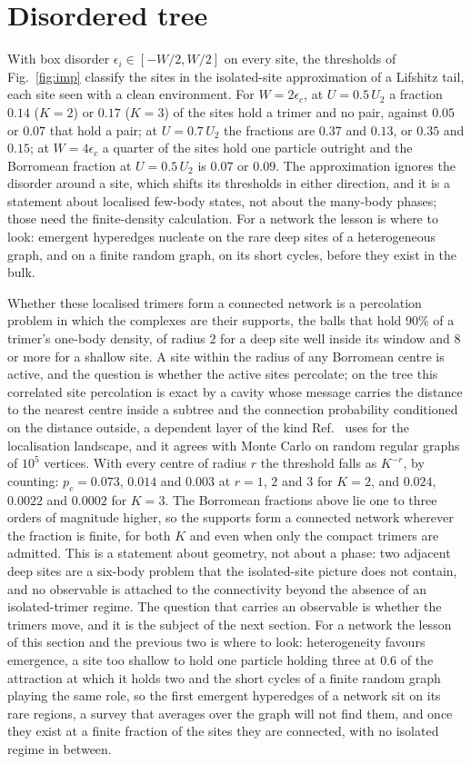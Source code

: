 \documentclass[aps,pre,twocolumn,superscriptaddress,floatfix]{revtex4-2}
\newcommand{\Up}{U_{2}}
\newcommand{\eps}{\epsilon}
\begin{document}
\section{Disordered tree}
\label{sec:disorder}
With box disorder $\eps_{i}\in[-W/2,W/2]$ on
every site, the thresholds of Fig.~\ref{fig:imp} classify the sites in
the isolated-site approximation of a Lifshitz tail, each site seen with a
clean environment. For $W=2\eps_{c}$, at $U=0.5\,\Up$ a fraction $0.14$
($K=2$) or $0.17$ ($K=3$) of the sites hold a trimer and no pair, against
$0.05$ or $0.07$ that hold a pair; at $U=0.7\,\Up$ the fractions are
$0.37$ and $0.13$, or $0.35$ and $0.15$; at $W=4\eps_{c}$ a quarter of the
sites hold one particle outright and the Borromean fraction at
$U=0.5\,\Up$ is $0.07$ or $0.09$. The approximation ignores the disorder
around a site, which shifts its thresholds in either direction, and it is
a statement about localised few-body states, not about the many-body
phases; those need the finite-density calculation. For a network the
lesson is where to look: emergent hyperedges nucleate on the rare deep
sites of a heterogeneous graph, and on a finite random graph, on its
short cycles, before they exist in the bulk.

Whether these localised trimers form a connected network is a
percolation problem in which the complexes are their supports, the balls
that hold $90\%$ of a trimer's one-body density, of radius $2$ for a deep
site well inside its window and $8$ or more for a shallow site. A site
within the radius of any Borromean centre is active, and the question is
whether the active sites percolate; on the tree this correlated site percolation is exact by a cavity
whose message carries the distance to the nearest centre inside a
subtree and the connection probability conditioned on the distance
outside, a dependent layer of the kind Ref.~\cite{chybook} uses for the
localisation landscape, and it agrees with Monte Carlo on random regular
graphs of $10^{5}$ vertices. With every centre of radius
$r$ the threshold falls as $K^{-r}$, by counting: $p_{c}=0.073$, $0.014$
and $0.003$ at $r=1$, $2$ and $3$ for $K=2$, and $0.024$, $0.0022$ and
$0.0002$ for $K=3$. The Borromean fractions above lie one to three orders
of magnitude higher, so the supports form a connected network wherever
the fraction is finite, for both $K$ and even when only the compact
trimers are admitted. This is a statement about geometry, not about a
phase: two adjacent deep sites are a six-body problem that the
isolated-site picture does not contain, and no observable is attached to
the connectivity beyond the absence of an isolated-trimer regime. The
question that carries an observable is whether the trimers move, and it
is the subject of the next section. For a network the lesson of this
section and the previous two is where to look: heterogeneity favours
emergence, a site too shallow to hold one particle holding three at
$0.6$ of the attraction at which it holds two and the short cycles of a
finite random graph playing the same role, so the first emergent
hyperedges of a network sit on its rare regions, a survey that averages
over the graph will not find them, and once they exist at a finite
fraction of the sites they are connected, with no isolated regime in
between.
\end{document}
